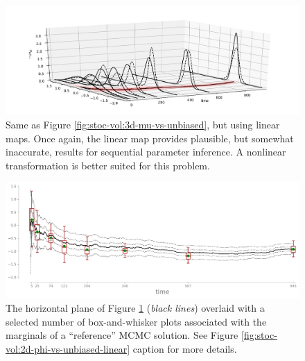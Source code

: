 \documentclass[twoside,11pt]{article}
\begin{document}
\begin{figure}[H]
  \centering
  \includegraphics[width=1.0\textwidth, bb=65bp 20bp 775bp 280bp, clip]{o1-filtering-marginals-timesteps_mu-3d.pdf}
  \caption{ Same as Figure \ref{fig:stoc-vol:3d-mu-vs-unbiased}, but
    using linear maps. Once again, the linear map provides plausible,
    but somewhat inaccurate, results for sequential parameter inference. A nonlinear transformation is
    better suited for this problem.  }
  \label{fig:stoc-vol:3d-mu-vs-unbiased-linear}
\end{figure}

\begin{figure}[H]
  \centering
  \includegraphics[width=1.0\textwidth, bb=0bp 0bp 925bp 355bp, clip]{filtering-marginals-timesteps_mu-boxplot.pdf}
  \caption{
    The horizontal plane of 
  Figure \ref{fig:stoc-vol:3d-mu-vs-unbiased-linear} ({\it black lines})
  overlaid with a selected number of box-and-whisker plots 
   associated with the marginals of a ``reference'' MCMC solution.
  See Figure \ref{fig:stoc-vol:2d-phi-vs-unbiased-linear} caption
  for more details. 
}
  \label{fig:stoc-vol:2d-mu-vs-unbiased-linear}
\end{figure}
\end{document}
